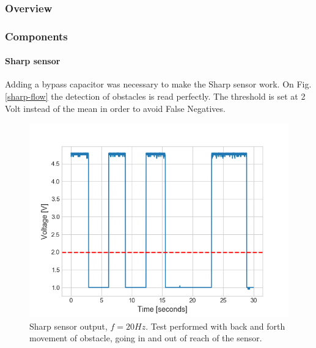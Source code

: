 \documentclass[10pt]{beamer}
\begin{document}
\begin{frame}
\frametitle{Overview}
\tableofcontents[currentsection,subsectionstyle=shaded]
\end{frame}

\begin{frame}
\frametitle{Components}
\framesubtitle{Sharp sensor}
Adding a bypass capacitor was necessary to make the Sharp sensor work. On Fig.\ref{sharp-flow} the detection of obstacles is read perfectly. The threshold is set at 2 Volt instead of the mean in order to avoid False Negatives.
\vspace*{-2mm}
\begin{figure}[hbtp]
\centering
\label{fig:sharp-flow}
\includegraphics[scale=0.45]{figures/sharp-flow.png}
\vspace*{-2mm}
\caption{Sharp sensor output, $f=20Hz$. Test performed with back and forth movement of obstacle, going in and out of reach of the sensor.}
\end{figure}
\end{frame}


\end{document}
